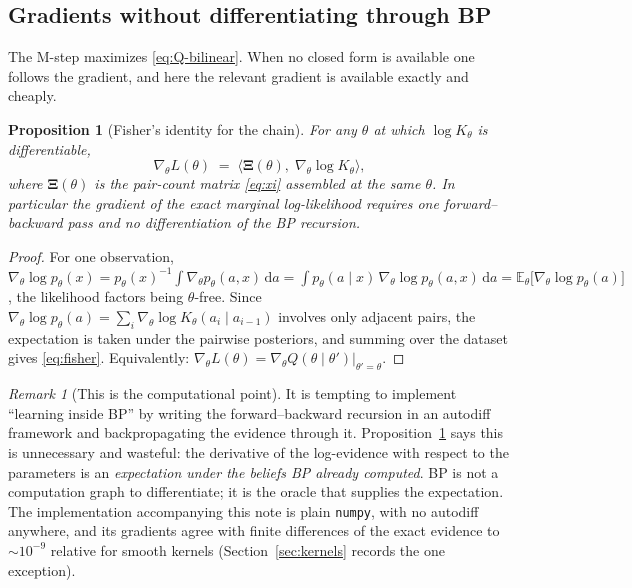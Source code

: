 \documentclass[11pt]{article}
\newtheorem{proposition}{Proposition}
\theoremstyle{remark}
\newtheorem{remark}{Remark}
\newcommand{\E}{\mathbb{E}}
\newcommand{\dd}{\,\mathrm{d}}
\newcommand{\Xibf}{\bm{\Xi}}
\begin{document}
\subsection{Gradients without differentiating through BP}

The M-step maximizes \eqref{eq:Q-bilinear}. When no closed form is available one
follows the gradient, and here the relevant gradient is available exactly and
cheaply.

\begin{proposition}[Fisher's identity for the chain]
\label{prop:fisher}
For any $\theta$ at which $\log K_\theta$ is differentiable,
\begin{equation}
  \nabla_\theta L(\theta)
  \;=\;
  \bigl\langle \Xibf(\theta),\; \nabla_\theta \log K_\theta \bigr\rangle,
  \label{eq:fisher}
\end{equation}
where $\Xibf(\theta)$ is the pair-count matrix \eqref{eq:xi} assembled at the
same $\theta$. In particular the gradient of the \emph{exact marginal
log-likelihood} requires one forward--backward pass and no differentiation of
the BP recursion.
\end{proposition}

\begin{proof}
For one observation,
$\nabla_\theta \log p_\theta(x)
 = p_\theta(x)^{-1}\!\int \nabla_\theta p_\theta(a,x)\dd a
 = \int p_\theta(a\mid x)\, \nabla_\theta \log p_\theta(a,x) \dd a
 = \E_{\theta}\bigl[\nabla_\theta \log p_\theta(a)\bigr]$,
the likelihood factors being $\theta$-free. Since
$\nabla_\theta \log p_\theta(a) = \sum_i \nabla_\theta \log K_\theta(a_i\mid a_{i-1})$
involves only adjacent pairs, the expectation is taken under the pairwise
posteriors, and summing over the dataset gives \eqref{eq:fisher}. Equivalently:
$\nabla_\theta L(\theta) = \nabla_\theta Q(\theta \mid \theta')|_{\theta'=\theta}$.
\end{proof}

\begin{remark}[This is the computational point]
It is tempting to implement ``learning inside BP'' by writing the
forward--backward recursion in an autodiff framework and backpropagating the
evidence through it. Proposition~\ref{prop:fisher} says this is unnecessary and
wasteful: the derivative of the log-evidence with respect to the parameters is
an \emph{expectation under the beliefs BP already computed}. BP is not a
computation graph to differentiate; it is the oracle that supplies the
expectation. The implementation accompanying this note is plain \texttt{numpy},
with no autodiff anywhere, and its gradients agree with finite differences of
the exact evidence to $\sim\!10^{-9}$ relative for smooth kernels
(Section~\ref{sec:kernels} records the one exception).
\end{remark}
\end{document}
